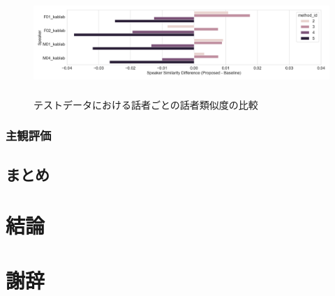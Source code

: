 \documentclass[12pt]{jarticle}
\numberwithin{equation}{section}    %
\numberwithin{figure}{section}      %
\numberwithin{table}{section}      %
\begin{document}
\begin{figure}[bt]
    \centering
    \includegraphics[height=40mm]{./figure/sec4/obj_metrics/spk_sim_speaker_wise_comparison.png}
    \caption{テストデータにおける話者ごとの話者類似度の比較}
    \label{sec4:fig:spk_sim_speaker_wise_comparison}
\end{figure}

\clearpage

\subsubsection{主観評価}

\clearpage

\subsection{まとめ}

\clearpage

\section{結論}

\clearpage

\section*{謝辞}

\clearpage



\end{document}
